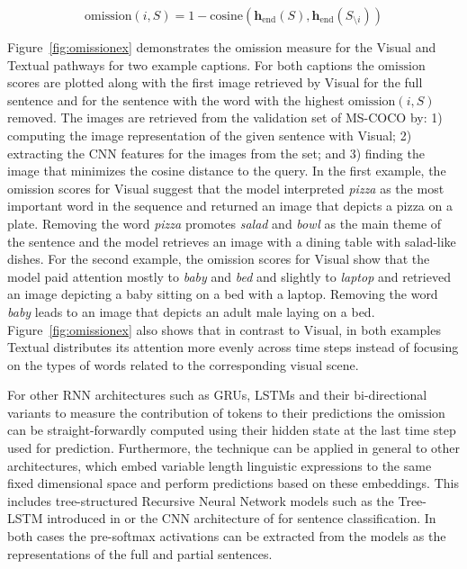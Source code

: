 \begin{equation}
\label{eg:omit}
\mathrm{omission}(i,S) = 1-\mathrm{cosine}(\mathbf{h}_\text{end}(S),
\mathbf{h}_\text{end}(S_{\setminus i}))
\end{equation}

\noindent Figure~\ref{fig:omissionex} demonstrates the omission
measure for the {\sc Visual} and {\sc Textual} pathways for two
example captions. For both captions the $\mathrm{omission}$ scores are
plotted along with the first image retrieved by {\sc Visual} for the
full sentence and for the sentence with the word with the highest
$\mathrm{omission}(i,S)$ removed. The images are retrieved from the
validation set of MS-COCO by: 1) computing the image representation of the 
given sentence with {\sc Visual}; 2) extracting the CNN features for the 
images from the set; and 3) finding the image that minimizes the cosine distance
to the query.\label{edit:retrievalexplain} 
In the first example, the omission
scores for {\sc Visual} suggest that the model interpreted {\it  pizza} as the most important
word in the sequence and returned an image that depicts a pizza on a plate. 
Removing the word {\it pizza} promotes {\it salad} and {\it bowl} as
the main theme of the sentence and the model retrieves an image with a dining table 
with salad-like dishes. 
For the second example, the omission scores for {\sc
  Visual} show that the model paid attention mostly to {\it baby} and
{\it bed} and slightly to {\it laptop} and retrieved an image depicting a baby 
sitting on a bed with a laptop.
Removing the word {\it baby} leads
to an image that depicts an adult male laying on a bed. Figure~\ref{fig:omissionex}
also shows that in contrast to {\sc Visual}, in both examples {\sc
  Textual} distributes its attention more evenly across time steps
instead of focusing on the types of words related to the corresponding
visual scene.


For other RNN architectures such as GRUs, LSTMs \label{edit:omitgeneral}
and their bi-directional variants to measure the contribution
of tokens to their predictions the $\mathrm{omission}$ 
can be straight-forwardly computed using their hidden state 
at the last time step used for prediction. Furthermore, the technique 
can be applied in general to other architectures, which
embed variable length linguistic expressions to the same fixed dimensional
space and perform predictions based on these embeddings. 
This includes tree-structured Recursive Neural Network models such as the Tree-LSTM
introduced in  or the CNN architecture of  
for sentence classification. In both cases the pre-softmax activations can be extracted 
from the models as the representations of the full and partial sentences.   


